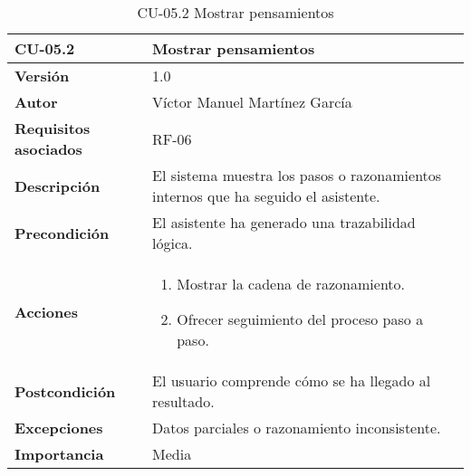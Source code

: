 \begin{table}[p]
    \centering
    \begin{tabularx}{\linewidth}{ p{} p{} }
        \toprule
        \textbf{CU-05.2}    & \textbf{Mostrar pensamientos}\\
        \toprule
        \textbf{Versión}              & 1.0 \\
        \textbf{Autor}                & Víctor Manuel Martínez García \\
        \textbf{Requisitos asociados} & RF-06 \\
        \textbf{Descripción}          & El sistema muestra los pasos o razonamientos internos que ha seguido el asistente.\\
        \textbf{Precondición}         & El asistente ha generado una trazabilidad lógica.\\
        \textbf{Acciones}             &
        \begin{enumerate}
          \item Mostrar la cadena de razonamiento.
          \item Ofrecer seguimiento del proceso paso a paso.
        \end{enumerate}\\
        \textbf{Postcondición}        & El usuario comprende cómo se ha llegado al resultado.\\
        \textbf{Excepciones}          & Datos parciales o razonamiento inconsistente.\\
        \textbf{Importancia}          & Media \\
        \bottomrule
    \end{tabularx}
    \caption{CU-05.2 Mostrar pensamientos}
    \label{CU-05.2 Mostrar pensamientos}
\end{table}

